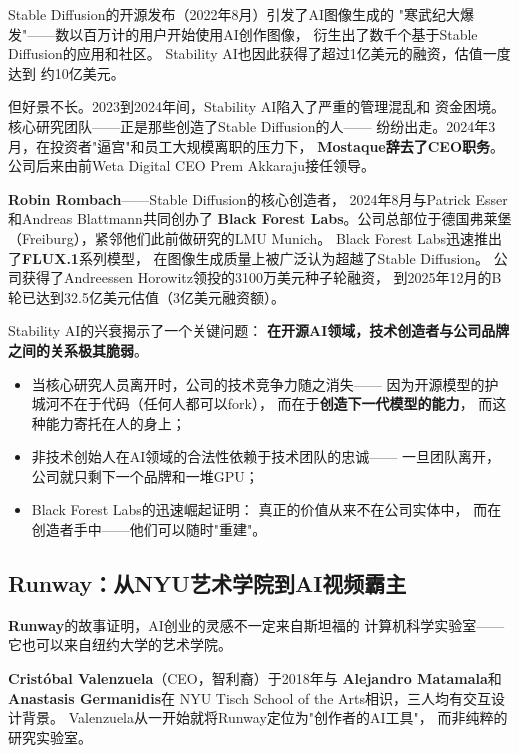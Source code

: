 Stable Diffusion的开源发布（2022年8月）引发了AI图像生成的
"寒武纪大爆发"——数以百万计的用户开始使用AI创作图像，
衍生出了数千个基于Stable Diffusion的应用和社区。
Stability AI也因此获得了超过1亿美元的融资，估值一度达到
约10亿美元。

但好景不长。2023到2024年间，Stability AI陷入了严重的管理混乱和
资金困境。核心研究团队——正是那些创造了Stable Diffusion的人——
纷纷出走。2024年3月，在投资者"逼宫"和员工大规模离职的压力下，
\textbf{Mostaque辞去了CEO职务}。公司后来由前Weta Digital CEO
Prem Akkaraju接任领导。

\textbf{Robin Rombach}——Stable Diffusion的核心创造者，
2024年8月与Patrick Esser和Andreas Blattmann共同创办了
\textbf{Black Forest Labs}。公司总部位于德国弗莱堡
（Freiburg），紧邻他们此前做研究的LMU Munich。
Black Forest Labs迅速推出了\textbf{FLUX.1}系列模型，
在图像生成质量上被广泛认为超越了Stable Diffusion。
公司获得了Andreessen Horowitz领投的3100万美元种子轮融资，
到2025年12月的B轮已达到32.5亿美元估值（3亿美元融资额）。

\begin{whybox}
Stability AI的兴衰揭示了一个关键问题：
\textbf{在开源AI领域，技术创造者与公司品牌之间的关系极其脆弱}。
\begin{itemize}
  \item 当核心研究人员离开时，公司的技术竞争力随之消失——
    因为开源模型的护城河不在于代码（任何人都可以fork），
    而在于\textbf{创造下一代模型的能力}，
    而这种能力寄托在人的身上；
  \item 非技术创始人在AI领域的合法性依赖于技术团队的忠诚——
    一旦团队离开，公司就只剩下一个品牌和一堆GPU；
  \item Black Forest Labs的迅速崛起证明：
    真正的价值从来不在公司实体中，
    而在创造者手中——他们可以随时"重建"。
\end{itemize}
\end{whybox}

\subsection{Runway：从NYU艺术学院到AI视频霸主}

\textbf{Runway}的故事证明，AI创业的灵感不一定来自斯坦福的
计算机科学实验室——它也可以来自纽约大学的艺术学院。

\textbf{Crist\'{o}bal Valenzuela}（CEO，智利裔）于2018年与
\textbf{Alejandro Matamala}和\textbf{Anastasis Germanidis}在
NYU Tisch School of the Arts相识，三人均有交互设计背景。
Valenzuela从一开始就将Runway定位为"创作者的AI工具"，
而非纯粹的研究实验室。

